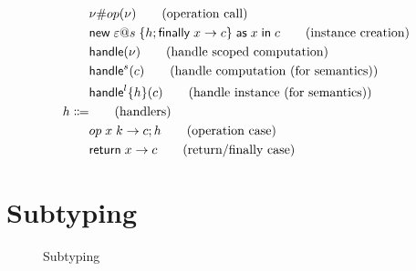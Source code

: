 {\begin{figure}
{\begin{minipage}{14 cm}
\begin{align*}
									& \nu \# op(\nu)							\tag{operation call} \\
									& \mathsf{new} \; \varepsilon @ s \; \{ h ; \mathsf{finally} \; x \rightarrow c \} \; \mathsf{as} \; x \;\mathsf{in}\; c		\tag{instance creation} \\
									& \mathsf{handle} ( \nu )										\tag{handle scoped computation} \\
									& \mathsf{handle}^{s} ( c )								\tag{handle computation (for semantics)} \\
									& \mathsf{handle}^{l} \{ h \} ( c )	\tag{handle instance (for semantics)} \\
	h \Coloneqq 		&															\tag{handlers} \\
									& op \; x \; k \rightarrow c ; h	\tag{operation case} \\
									& \mathsf{return} \; x \rightarrow c								\tag{return/finally case} \\
\end{align*}
\label{fig:syntax-calc}
\end{minipage}
}
\end{figure}

\section{Subtyping}
\begin{figure}
\caption{Subtyping}
\centering
{}
\end{figure}

}
